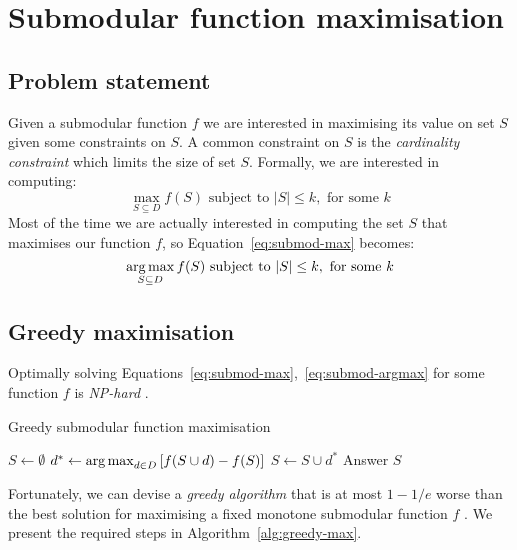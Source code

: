 \section{Submodular function maximisation}
\label{sec:submod-max}

\subsection{Problem statement}

Given a submodular function \(f\) we are interested in maximising its value on
set \(S\) given some constraints on \(S\). A common constraint on \(S\) is the
\emph{cardinality constraint} which limits the size of set \(S\). Formally,
we are interested in computing:
\begin{equation}
  \label{eq:submod-max}
  \max_{S \subseteq D} f(S) \text{ subject to } |S| \leq k, \text{ for some } k
\end{equation}
Most of the time we are actually interested in computing the set \(S\) that
maximises our function \(f\), so Equation~\ref{eq:submod-max} becomes:
\begin{equation}
  \label{eq:submod-argmax}
  \operatorname*{arg\,max}_{S \subseteq D} f(S) \text{ subject to } |S| \leq k, \text{ for some
  } k
\end{equation}

\subsection{Greedy maximisation}
Optimally solving Equations~\ref{eq:submod-max},~\ref{eq:submod-argmax} for
some function \(f\) is \emph{NP-hard} .
\begin{algorithm}
  \caption{Greedy submodular function maximisation}
  \label{alg:greedy-max}
  \begin{algorithmic}
    \STATE \(S \gets \emptyset\)
      \STATE \(d^* \gets \operatorname*{arg\,max}_{d \in D} \left[ f(S \cup {d}) - f(S)
          \right]\)
      \STATE \(S \gets S \cup {d^*}\)
    \ENDWHILE
    Answer \(S\)
  \end{algorithmic}
\end{algorithm}
Fortunately, we can devise a \emph{greedy algorithm} that is at most \(1 - 1 /
e\) worse than the best solution for maximising a fixed monotone submodular
function \(f\) \cite{nemhauser1978analysis}. We present the required steps in
Algorithm~\ref{alg:greedy-max}.

